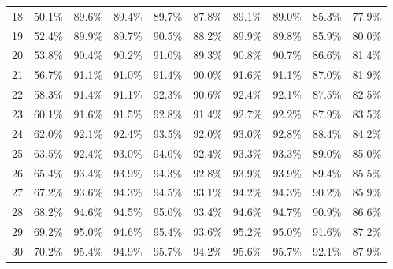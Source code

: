 \begin{table}[h]
\begin{center}
\begin{tabular}{c|p{1.2cm}p{1.1cm}p{1.1cm}p{1.7cm}p{1.5cm}p{1.2cm}p{1.2cm}p{1.2cm}p{1.2cm}}
	18 & 50.1\% & 89.6\% & 89.4\% & 89.7\% & 87.8\% & 89.1\% & 89.0\% & 85.3\% & 77.9\% \\ 
	19 & 52.4\% & 89.9\% & 89.7\% & 90.5\% & 88.2\% & 89.9\% & 89.8\% & 85.9\% & 80.0\% \\ 
	20 & 53.8\% & 90.4\% & 90.2\% & 91.0\% & 89.3\% & 90.8\% & 90.7\% & 86.6\% & 81.4\% \\ 
	21 & 56.7\% & 91.1\% & 91.0\% & 91.4\% & 90.0\% & 91.6\% & 91.1\% & 87.0\% & 81.9\% \\ 
	22 & 58.3\% & 91.4\% & 91.1\% & 92.3\% & 90.6\% & 92.4\% & 92.1\% & 87.5\% & 82.5\% \\ 
	23 & 60.1\% & 91.6\% & 91.5\% & 92.8\% & 91.4\% & 92.7\% & 92.2\% & 87.9\% & 83.5\% \\ 
	24 & 62.0\% & 92.1\% & 92.4\% & 93.5\% & 92.0\% & 93.0\% & 92.8\% & 88.4\% & 84.2\% \\ 
	25 & 63.5\% & 92.4\% & 93.0\% & 94.0\% & 92.4\% & 93.3\% & 93.3\% & 89.0\% & 85.0\% \\ 
	26 & 65.4\% & 93.4\% & 93.9\% & 94.3\% & 92.8\% & 93.9\% & 93.9\% & 89.4\% & 85.5\% \\ 
	27 & 67.2\% & 93.6\% & 94.3\% & 94.5\% & 93.1\% & 94.2\% & 94.3\% & 90.2\% & 85.9\% \\ 
	28 & 68.2\% & 94.6\% & 94.5\% & 95.0\% & 93.4\% & 94.6\% & 94.7\% & 90.9\% & 86.6\% \\ 
	29 & 69.2\% & 95.0\% & 94.6\% & 95.4\% & 93.6\% & 95.2\% & 95.0\% & 91.6\% & 87.2\% \\ 
	30 & 70.2\% & 95.4\% & 94.9\% & 95.7\% & 94.2\% & 95.6\% & 95.7\% & 92.1\% & 87.9\% \\
	\hline\hline
    \end{tabular}
    \label{tab:media_lbph}
    \end{center}
\end{table}	